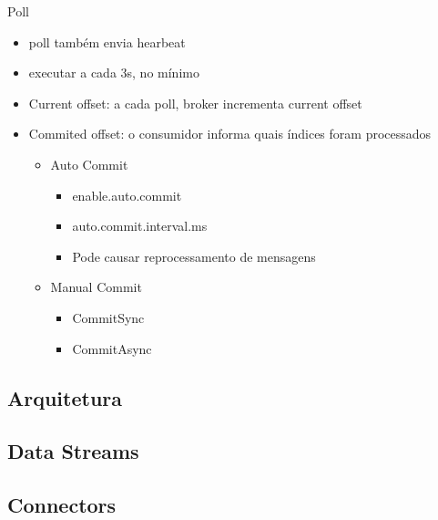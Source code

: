 \begin{frame}{Poll}
\begin{itemize}
	\item poll também envia hearbeat
	\item executar a cada 3s, no mínimo	
	\item Current offset: a cada poll, broker incrementa current offset
	\item Commited offset: o consumidor informa quais índices foram processados
	\begin{itemize}
		\item Auto Commit
		\begin{itemize}
			\item enable.auto.commit
			\item auto.commit.interval.ms
			\item Pode causar reprocessamento de mensagens
		\end{itemize}
		\item Manual Commit
		\begin{itemize}
			\item CommitSync
			\item CommitAsync
		\end{itemize}
	\end{itemize}
\end{itemize}
\end{frame}


\subsection{Arquitetura}




\subsection{Data Streams}
\subsection{Connectors}


